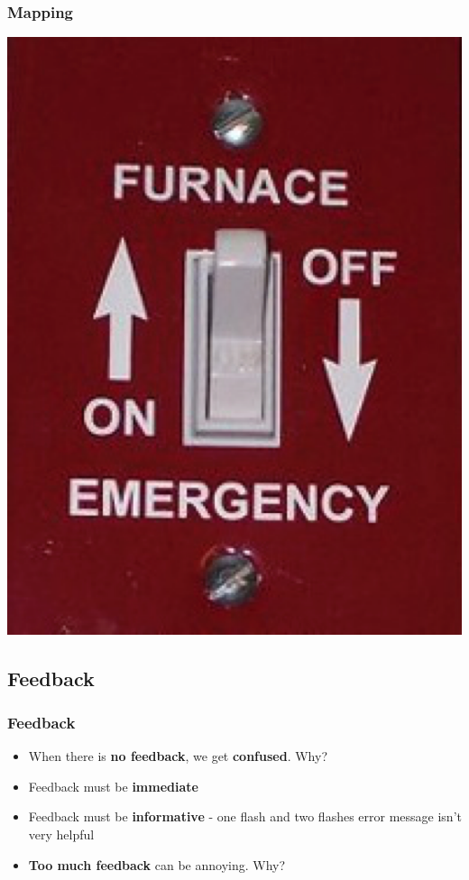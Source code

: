 \documentclass{beamer}
\begin{document}
\begin{frame}
\frametitle{Mapping}
%	
	\centering
	\includegraphics[width=0.4\linewidth]{switch}
	
\end{frame}

\subsection{Feedback}
\begin{frame}
\frametitle{Feedback}
\begin{itemize}
	\item When there is \textbf{no feedback}, we get \textbf{confused}.  Why?
	\item Feedback must be \textbf{immediate} %
	\item Feedback must be \textbf{informative} - one flash and two flashes error message isn't very helpful
	\item \textbf{Too much feedback} can be annoying. Why? %
\end{itemize}
\end{frame}
\end{document}
